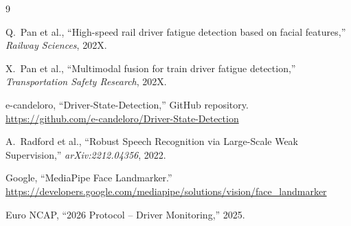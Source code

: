 \documentclass[12pt,a4paper]{ctexart}
\begin{document}
\begin{thebibliography}{9}

Q.~Pan et al., ``High-speed rail driver fatigue detection based on facial features,'' \emph{Railway Sciences}, 202X.

X.~Pan et al., ``Multimodal fusion for train driver fatigue detection,'' \emph{Transportation Safety Research}, 202X.

e-candeloro, ``Driver-State-Detection,'' GitHub repository.\\
\url{https://github.com/e-candeloro/Driver-State-Detection}

A.~Radford et al., ``Robust Speech Recognition via Large-Scale Weak Supervision,'' \emph{arXiv:2212.04356}, 2022.

Google, ``MediaPipe Face Landmarker.''\\
\url{https://developers.google.com/mediapipe/solutions/vision/face_landmarker}

Euro NCAP, ``2026 Protocol -- Driver Monitoring,'' 2025.

\end{thebibliography}
\end{document}
